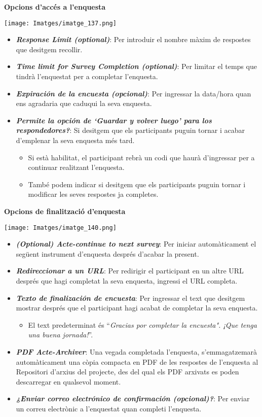 \documentclass[
]{article}
\providecommand{\tightlist}{%
  \setlength{\itemsep}{0pt}\setlength{\parskip}{0pt}}
\begin{document}
\textbf{Opcions d'accés a l'enquesta}

\texttt{[image: Imatges/imatge\_137.png]}

\begin{itemize}
\tightlist
\item
  \textbf{\emph{Response Limit (optional)}}: Per introduir el nombre màxim de respostes que desitgem recollir.
\item
  \textbf{\emph{Time limit for Survey Completion (optional)}}: Per limitar el temps que tindrà l'enquestat per a completar l'enquesta.
\item
  \textbf{\emph{Expiración de la encuesta (opcional)}}: Per ingressar la data/hora quan ens agradaria que caduqui la seva enquesta.
\item
  \textbf{\emph{Permite la opción de `Guardar y volver luego' para los respondedores?}}: Si desitgem que els participants puguin tornar i acabar d'emplenar la seva enquesta més tard.

  \begin{itemize}
  \tightlist
  \item
    Si està habilitat, el participant rebrà un codi que haurà d'ingressar per a continuar realitzant l'enquesta.
  \item
    També podem indicar si desitgem que els participants puguin tornar i modificar les seves respostes ja completes.
  \end{itemize}
\end{itemize}

\textbf{Opcions de finalització d'enquesta}

\texttt{[image: Imatges/imatge\_140.png]}

\begin{itemize}
\tightlist
\item
  \textbf{\emph{(Optional) Acte-continue to next survey}}: Per iniciar automàticament el següent instrument d'enquesta després d'acabar la present.
\item
  \textbf{\emph{Redireccionar a un URL}}: Per redirigir el participant en un altre URL després que hagi completat la seva enquesta, ingressi el URL completa.
\item
  \textbf{\emph{Texto de finalización de encuesta}}: Per ingressar el text que desitgem mostrar després que el participant hagi acabat de completar la seva enquesta.

  \begin{itemize}
  \tightlist
  \item
    El text predeterminat és ``\emph{Gracias por completar la encuesta". ¡Que tenga una buena jornada!}''.
  \end{itemize}
\item
  \textbf{\emph{PDF Acte-Archiver}}: Una vegada completada l'enquesta, s'emmagatzemarà automàticament una còpia compacta en PDF de les respostes de l'enquesta al Repositori d'arxius del projecte, des del qual els PDF arxivats es poden descarregar en qualsevol moment.
\item
  \textbf{\emph{¿Enviar correo electrónico de confirmación (opcional)?}}: Per enviar un correu electrònic a l'enquestat quan completi l'enquesta.
\end{itemize}
\end{document}
